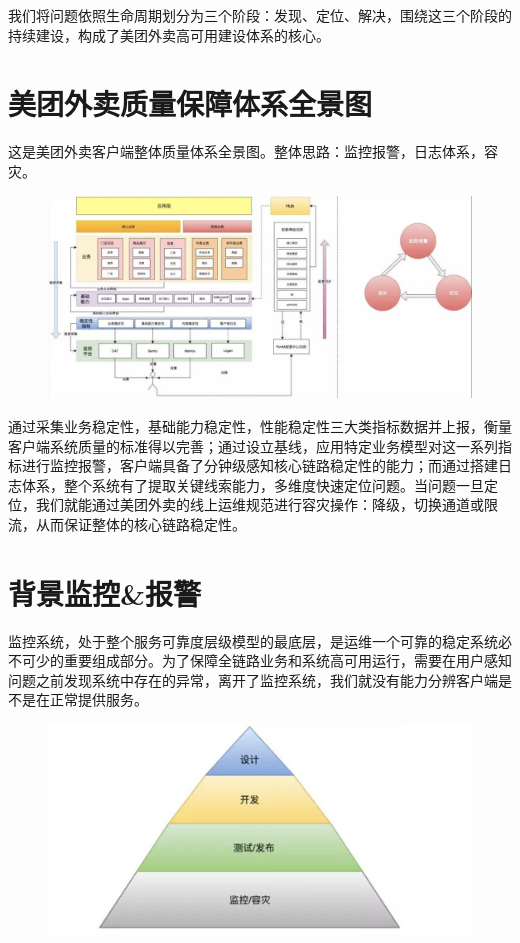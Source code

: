 \documentclass[12pt]{article}
\begin{document}
我们将问题依照生命周期划分为三个阶段：发现、定位、解决，围绕这三个阶段的持续建设，构成了美团外卖高可用建设体系的核心。

\section{美团外卖质量保障体系全景图}
这是美团外卖客户端整体质量体系全景图。整体思路：监控报警，日志体系，容灾。

\begin{figure}[H]
    \centering
    \includegraphics[width=1\textwidth]{fig/Meituan_APP_High_2.png}
\end{figure}

通过采集业务稳定性，基础能力稳定性，性能稳定性三大类指标数据并上报，衡量客户端系统质量的标准得以完善；通过设立基线，应用特定业务模型对这一系列指标进行监控报警，客户端具备了分钟级感知核心链路稳定性的能力；而通过搭建日志体系，整个系统有了提取关键线索能力，多维度快速定位问题。当问题一旦定位，我们就能通过美团外卖的线上运维规范进行容灾操作：降级，切换通道或限流，从而保证整体的核心链路稳定性。

\section{ 背景监控\&报警}
监控系统，处于整个服务可靠度层级模型的最底层，是运维一个可靠的稳定系统必不可少的重要组成部分。为了保障全链路业务和系统高可用运行，需要在用户感知问题之前发现系统中存在的异常，离开了监控系统，我们就没有能力分辨客户端是不是在正常提供服务。

\begin{figure}[H]
    \centering
    \includegraphics[width=1\textwidth]{fig/Meituan_APP_High_3.png}
\end{figure}
\end{document}
